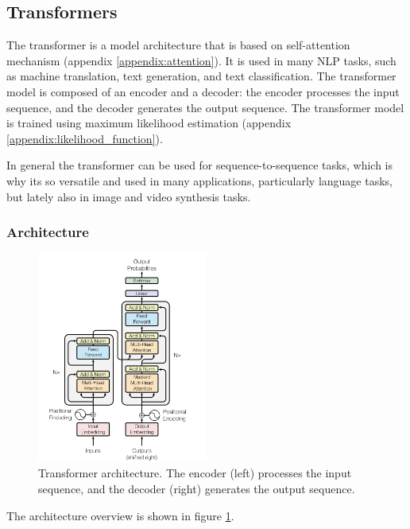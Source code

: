 \subsection{Transformers}
\label{appendix:transformers}

The transformer \cite{transformer} is a model architecture that is based on self-attention mechanism (appendix \ref{appendix:attention}). It is used in many NLP tasks, such as machine translation, text generation, and text classification. The transformer model is composed of an encoder and a decoder: the encoder processes the input sequence, and the decoder generates the output sequence. The transformer model is trained using maximum likelihood estimation (appendix \ref{appendix:likelihood_function}).

In general the transformer can be used for sequence-to-sequence tasks, which is why its so versatile and used in many applications, particularly language tasks, but lately also in image and video synthesis tasks.

\subsubsection{Architecture}

\begin{figure}
    \centering
    \includegraphics[width=0.5\textwidth]{images/appendix/transformer/architecture.png}
    \caption{Transformer architecture. The encoder (left) processes the input sequence, and the decoder (right) generates the output sequence.}
    \label{fig:appendix_transformer_architecture}
\end{figure}

The architecture overview is shown in figure \ref{fig:appendix_transformer_architecture}.

